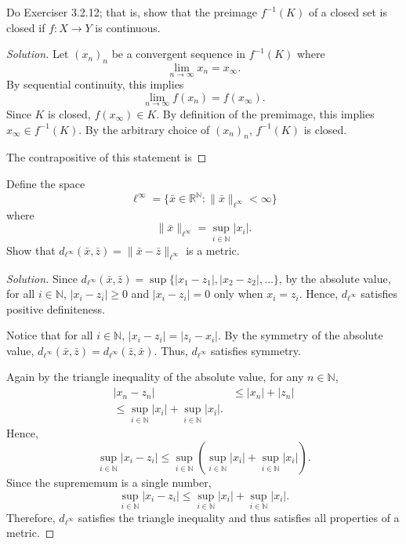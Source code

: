 \documentclass[11pt,letterpaper]{article}
\newcommand{\N}{\mathbb{N}}
\newcommand{\R}{\mathbb{R}}
\newenvironment{prob}[1]
  {\renewcommand\theinnerprob{#1}\innerprob}
  {\endinnerprob}
\newenvironment{solution}
  {\renewcommand\qedsymbol{}\begin{proof}[Solution]}
  {\end{proof}\bigskip}
\begin{document}
\begin{prob}{4}  %
Do Exerciser 3.2.12; that is, show that the preimage $f^{-1}(K)$ of a closed set is closed if $f:X \to Y$ is continuous.
\end{prob}
\begin{solution}
	Let $(x_n)_n$ be a convergent sequence in $f^{-1}(K)$ where $$\lim_{n\to\infty} x_n = x_\infty.$$ By sequential continuity, this implies $$\lim_{n\to\infty} f(x_n) = f(x_\infty).$$ Since $K$ is closed, $f(x_\infty) \in K$. By definition of the premimage, this implies $x_\infty \in f^{-1}(K)$. By the arbitrary choice of $(x_n)_n$, $f^{-1}(K)$ is closed.
	
	The contrapositive of this statement is 
\end{solution}
\newpage










\begin{prob}{5} %
Define the space
\[
	\ell^\infty = \{ \bar x \in \R^\N : \|\bar x\|_{\ell^\infty} < \infty\}
\]
where
\[
	\|\bar x\|_{\ell^\infty}
		= \sup_{i\in \N} |x_i|.
\]
Show that $d_{\ell^\infty}(\bar x, \bar z) = \|\bar x - \bar z\|_{\ell^\infty}$ is a metric.
\end{prob}
\begin{solution}
	Since $d_{\ell^\infty}(\bar x, \bar z) = \sup\{|x_1 - z_1|, |x_2-z_2|, \dots \}$, by the absolute value, for all $i \in \N$, $|x_i - z_i| \geq 0$ and $|x_i - z_i| = 0$ only when $x_i = z_i$. Hence, $d_{\ell^\infty}$ satisfies positive definiteness.
	
	Notice that for all $i \in \N$, $|x_i - z_i| = |z_i - x_i|$. By the symmetry of the absolute value, $d_{\ell^\infty}(\bar x, \bar z) = d_{\ell^\infty}(\bar z, \bar x)$. Thus, $d_{\ell^\infty}$ satisfies symmetry.
	
	Again by the triangle inequality of the absolute value, for any $n\in \N$,
	\[\begin{split}
		|x_n - z_n| &\leq |x_n| + |z_n|\\
		\leq \sup_{i\in \N}|x_i| + \sup_{i\in \N}|x_i|.
	\end{split}\]
	Hence, $$\sup_{i\in \N}|x_i - z_i| \leq \sup_{i\in \N}\left (\sup_{i\in \N}|x_i| + \sup_{i\in \N}|x_i|\right ).$$ Since the suprememum is a single number, $$\sup_{i\in \N}|x_i - z_i| \leq \sup_{i\in \N}|x_i| + \sup_{i\in \N}|x_i|.$$ Therefore, $d_{\ell^\infty}$ satisfies the triangle inequality and thus satisfies all properties of a metric. 
\end{solution}
\newpage
\end{document}

